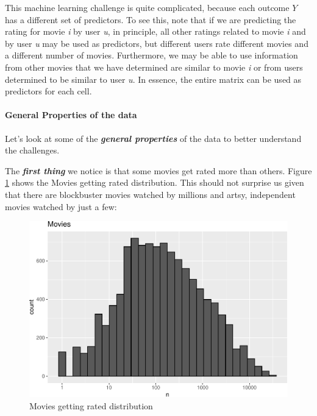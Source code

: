 \documentclass[
]{article}
\begin{document}
This machine learning challenge is quite complicated, because each
outcome \(Y\) has a different set of predictors. To see this, note that
if we are predicting the rating for movie \emph{i} by user \emph{u}, in
principle, all other ratings related to movie \emph{i} and by user
\emph{u} may be used as predictors, but different users rate different
movies and a different number of movies. Furthermore, we may be able to
use information from other movies that we have determined are similar to
movie \emph{i} or from users determined to be similar to user \emph{u}.
In essence, the entire matrix can be used as predictors for each cell.

\newpage

\hypertarget{general-properties-of-the-data}{%
\paragraph{General Properties of the
data}\label{general-properties-of-the-data}}

Let's look at some of the \textbf{\emph{general properties}} of the data
to better understand the challenges.

The \textbf{\emph{first thing}} we notice is that some movies get rated
more than others. Figure \ref{fig:movies_getting_rated} shows the Movies
getting rated distribution. This should not surprise us given that there
are blockbuster movies watched by millions and artsy, independent movies
watched by just a few:

\begin{figure}
\centering
\includegraphics{figures/eda_5-1.pdf}
\caption{Movies getting rated
distribution\label{fig:movies_getting_rated}}
\end{figure}
\end{document}
